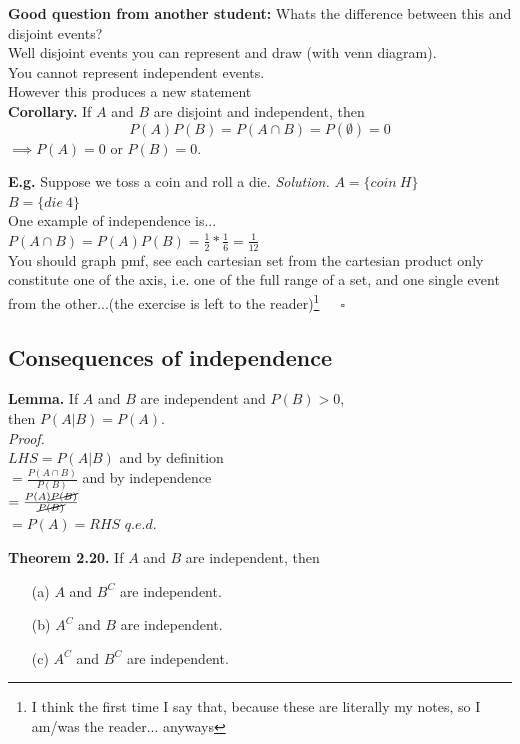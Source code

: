 \documentclass[12pt]{book}
\begin{document}
\noindent\textbf{Good question from another student:} Whats the difference between this and disjoint events?\\
Well disjoint events you can represent and draw (with venn diagram).\\
You cannot represent independent events.\\
However this produces a new statement\\

\noindent \textbf{Corollary. } If $A$ and $B$ are disjoint and independent, then 
$$P(A)P(B)=P(A\cap B)=P(\emptyset)=0$$
$\implies P(A)=0$ or $P(B)=0$.


\noindent \textbf{E.g. } Suppose we toss a coin and roll a die.
\textit{Solution. }
$A=\{coin~H\}$\\
$B=\{die~4\}$\\
One example of independence is...\\
$P(A\cap B)=P(A)P(B)=\frac{1}{2} * \frac{1}{6} = \frac{1}{12}$\\
You should graph pmf, see each cartesian set from the cartesian product only constitute one of the axis, i.e. one of the full range of a set, and one single event from the other...(the exercise is left to the reader)\footnote{I think the first time I say that, because these are literally my notes, so I am/was the reader... anyways}~~~$\square$



\subsection{Consequences of independence}
\textbf{Lemma. } If $A$ and $B$ are independent and $P(B)>0$, \\then $P(A|B)=P(A)$.\\

\noindent \textit{Proof. }\\
$LHS = P(A|B)$ and by definition\\
$=\frac{P(A\cap B)}{P(B)}$ and by independence\\
$=\frac{P(A)\cancel{P(B)}}{\cancel{P(B)}}$\\
$=P(A)=RHS$ \hfill $q.e.d.$

\textbf{Theorem 2.20. } If $A$ and $B$ are independent, then
\begin{itemize}
\item [(a)] $A$ and $B^{C}$ are independent.
\item [(b)] $A^{C}$ and $B$ are independent.
\item [(c)] $A^{C}$ and $B^{C}$ are independent.
\end{itemize}
\end{document}
